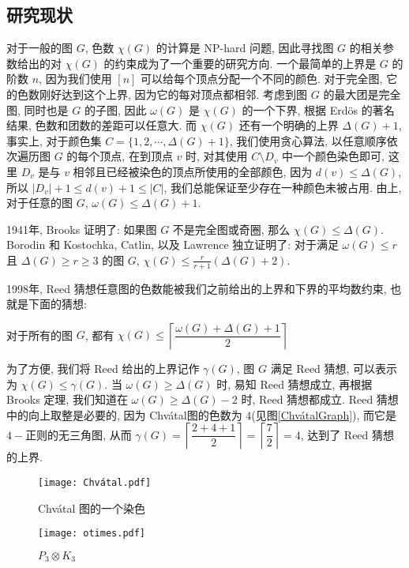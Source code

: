 \documentclass[12pt,a4paper]{article}%
\begin{document}
\subsection{研究现状}
对于一般的图 $G$, 色数 $\chi(G)$ 的计算是 NP-hard 问题, 因此寻找图 $G$ 的相关参数给出的对 $\chi(G)$ 的约束成为了一个重要的研究方向. 一个最简单的上界是 $G$ 的阶数 $n$, 因为我们使用 $[n]$ 可以给每个顶点分配一个不同的颜色. 对于完全图, 它的色数刚好达到这个上界, 因为它的每对顶点都相邻. 考虑到图 $G$ 的最大团是完全图, 同时也是 $G$ 的子图, 因此 $\omega(G)$ 是 $\chi(G)$ 的一个下界, 根据 Erdös\cite{Erdös1959} 的著名结果, 色数和团数的差距可以任意大. 而 $\chi(G)$ 还有一个明确的上界 $\Delta(G)+1$, 事实上, 对于颜色集 $C = \{1,2,\cdots,\Delta(G)+1\}$, 我们使用贪心算法, 以任意顺序依次遍历图 $G$ 的每个顶点, 在到顶点 $v$ 时, 对其使用 $C \setminus D_v$ 中一个颜色染色即可, 这里 $D_v$ 是与 $v$ 相邻且已经被染色的顶点所使用的全部颜色, 因为 $d(v) \leq \Delta(G)$, 所以 $|D_v|+1 \leq d(v)+1 \leq |C|$, 我们总能保证至少存在一种颜色未被占用. 由上, 对于任意的图 $G$, $\omega(G) \leq \Delta(G)+1$.

1941年, Brooks \cite{Brooks1987}证明了: 如果图 $G$ 不是完全图或奇圈, 那么 $\chi(G) \leq \Delta(G)$. Borodin 和 Kostochka, Catlin, 以及 Lawrence 独立证明了: 对于满足 $\omega(G) \leq r$ 且 $\Delta(G) \geq r \geq 3$ 的图 $G$, $\chi(G) \leq \frac{r}{r+1}(\Delta(G)+2)$.

1998年, Reed\cite{Reed1998} 猜想任意图的色数能被我们之前给出的上界和下界的平均数约束, 也就是下面的猜想:  

\begin{Conjecture}\label{ReedConjecture}
对于所有的图 $G$, 都有 $\chi (G) \leq \left\lceil \dfrac{\omega (G) + \Delta (G) + 1}{2}  \right\rceil $
\end{Conjecture}

为了方便, 我们将 Reed 给出的上界记作 $\gamma(G)$, 图 $G$ 满足 Reed 猜想, 可以表示为 $\chi(G) \leq \gamma(G)$. 当 $\omega(G) \geq \Delta(G)$ 时, 易知 Reed 猜想成立, 再根据 Brooks 定理, 我们知道在 $\omega(G) \geq \Delta(G) - 2$ 时, Reed 猜想都成立. Reed 猜想中的向上取整是必要的, 因为 Chvátal图的色数为 $4$(见图\ref{ChvátalGraph}), 而它是$4-$正则的无三角图\cite{Chvátal1970}, 从而 $\gamma(G) = \left\lceil \dfrac{2 + 4 + 1}{2}  \right\rceil = \left\lceil \dfrac{7}{2}  \right\rceil = 4$, 达到了 Reed 猜想的上界.

\begin{figure}[b]
    \begin{minipage}{0.35\textwidth}
    \centering
    \texttt{[image: Chvátal.pdf]}
    \caption{Chvátal 图的一个染色}
    \label{ChvátalGraph}
    \end{minipage}
    \hfill
    \begin{minipage}{0.35\textwidth}
    \centering
    \texttt{[image: otimes.pdf]}
    \caption{$P_3\otimes K_3$}
    \label{otimes_pic}
    \end{minipage}
\end{figure}
\end{document}
